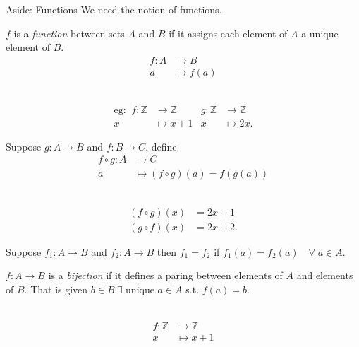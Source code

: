 \begin{aside}{Aside: Functions}
We need the notion of functions.
\begin{definition}[Function]
  $f$ is a \emph{function} between sets $A$ and $B$ if it assigns each element of $A$ a unique element of $B$.
\begin{align*}
    f: A &\to B \\
    a &\mapsto f(a)
\end{align*}
\end{definition} 

\begin{example}  ~\vspace*{-1.5\baselineskip}
  \begin{align*}
    \text{eg: }\ f: \mathbb{Z} &\to \mathbb{Z} & g: \mathbb{Z} &\to \mathbb{Z} \\
    x &\mapsto x + 1 & x &\mapsto 2x.
  \end{align*}
\end{example} 

\begin{definition}
  Suppose $g: A \to B$ and $f: B \to C$, define
  \begin{align*}
    f \circ g: A &\to C \\
    a &\mapsto (f \circ g)(a) = f(g(a))
  \end{align*} 
\end{definition} 

\begin{example} ~\vspace*{-1.5\baselineskip}
  \begin{align*}
    (f \circ g)(x) &= 2x + 1 \\
    (g \circ f)(x) &= 2x + 2.
  \end{align*} 
\end{example} 

Suppose $f_1: A \to B$ and $f_2: A \to B$ then $f_1 = f_2$ if $f_1(a) = f_2(a) \quad \forall \; a \in A$.

\begin{definition}
  $f: A \to B$ is a \emph{bijection} if it defines a paring between elements of $A$ and elements of $B$. That is given $b \in B \ \exists$ unique $a \in A$ s.t. $f(a) = b$.
\end{definition} 

\begin{example}~
\vspace*{-1.5\baselineskip} %
  \begin{align*}
    f: \mathbb{Z} &\to \mathbb{Z} \\
    x &\mapsto x + 1
  \end{align*}
\end{example} 


\end{aside}
